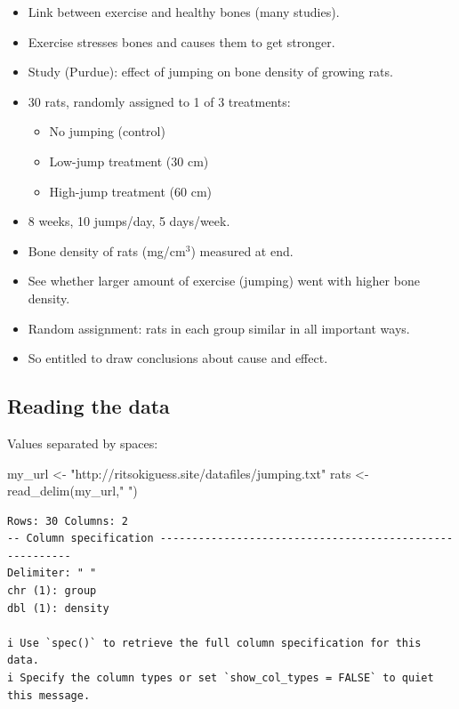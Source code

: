 \documentclass[
  letterpaper,
  DIV=11,
  numbers=noendperiod]{scrartcl}
\newenvironment{Shaded}{\begin{snugshade}}{\end{snugshade}}
\newcommand{\FunctionTok}[1]{\textcolor[rgb]{0.28,0.35,0.67}{#1}}
\newcommand{\NormalTok}[1]{\textcolor[rgb]{0.00,0.23,0.31}{#1}}
\newcommand{\OtherTok}[1]{\textcolor[rgb]{0.00,0.23,0.31}{#1}}
\newcommand{\StringTok}[1]{\textcolor[rgb]{0.13,0.47,0.30}{#1}}
\providecommand{\tightlist}{%
  \setlength{\itemsep}{0pt}\setlength{\parskip}{0pt}}\usepackage{longtable,booktabs,array}
\begin{document}
\begin{itemize}
\tightlist
\item
  Link between exercise and healthy bones (many studies).
\item
  Exercise stresses bones and causes them to get stronger.
\item
  Study (Purdue): effect of jumping on bone density of growing rats.
\item
  30 rats, randomly assigned to 1 of 3 treatments:

  \begin{itemize}
  \tightlist
  \item
    No jumping (control)
  \item
    Low-jump treatment (30 cm)
  \item
    High-jump treatment (60 cm)
  \end{itemize}
\item
  8 weeks, 10 jumps/day, 5 days/week.
\item
  Bone density of rats (mg/cm\(^3\)) measured at end.
\item
  See whether larger amount of exercise (jumping) went with higher bone
  density.
\item
  Random assignment: rats in each group similar in all important ways.
\item
  So entitled to draw conclusions about cause and effect.
\end{itemize}

\hypertarget{reading-the-data}{%
\subsection{Reading the data}\label{reading-the-data}}

Values separated by spaces:

\small

\begin{Shaded}
\begin{Highlighting}[]
\NormalTok{my\_url }\OtherTok{\textless{}{-}} \StringTok{"http://ritsokiguess.site/datafiles/jumping.txt"}
\NormalTok{rats }\OtherTok{\textless{}{-}} \FunctionTok{read\_delim}\NormalTok{(my\_url,}\StringTok{" "}\NormalTok{)}
\end{Highlighting}
\end{Shaded}

\begin{verbatim}
Rows: 30 Columns: 2
-- Column specification --------------------------------------------------------
Delimiter: " "
chr (1): group
dbl (1): density

i Use `spec()` to retrieve the full column specification for this data.
i Specify the column types or set `show_col_types = FALSE` to quiet this message.
\end{verbatim}
\end{document}
